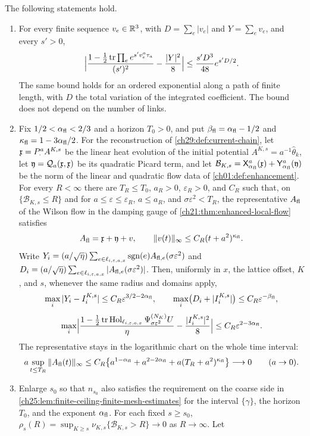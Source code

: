\begin{lemma}\label{ch29:lem:actual-flow-trace-reduction}
The following statements hold.
\begin{enumerate}
\item For every finite sequence $v_e\in\mathbb R^3$, with $D=\sum_e|v_e|$ and $Y=\sum_ev_e$, and every $s'>0$,
\[
 \Bigl|\frac{1-\tfrac12\operatorname{tr}\prod_ee^{s'v_e^a\tau_a}}{(s')^2}-\frac{|Y|^2}8\Bigr|\le\frac{s'D^3}{48}e^{s'D/2}.
\]
The same bound holds for an ordered exponential along a path of finite length, with $D$ the total variation of the integrated coefficient. The bound does not depend on the number of links.
\item Fix $1/2<\alpha_{\mathrm{fl}}<2/3$ and a horizon $T_0>0$, and put $\beta_{\mathrm{fl}}=\alpha_{\mathrm{fl}}-1/2$ and $\kappa_{\mathrm{fl}}=1-3\alpha_{\mathrm{fl}}/2$. For the reconstruction of \cref{ch29:def:current-chain}, let $\mathfrak x=P_{\cdot}^{a}A^{K,s}$ be the linear heat evolution of the initial potential $A^{K,s}=a^{-1}\widehat\theta_k$, let $\mathfrak y=\mathcal Q_{a}(\mathfrak x,\mathfrak x)$ be its quadratic Picard term, and let $\mathcal B_{K,s}=\mathsf X_{\alpha_{\mathrm{fl}}}^{a}(\mathfrak x)+\mathsf Y_{\alpha_{\mathrm{fl}}}^{a}(\mathfrak y)$ be the norm of the linear and quadratic flow data of \cref{ch01:def:enhancement}. For every $R<\infty$ there are $T_R\le T_0$, $a_R>0$, $\varepsilon_R>0$, and $C_R$ such that, on $\{\mathcal B_{K,s}\le R\}$ and for $a\le\varepsilon\le\varepsilon_R$, $a\le a_R$, and $\sigma\varepsilon^2<T_R$, the representative $A_{\rm fl}$ of the Wilson flow in the damping gauge of \cref{ch21:thm:enhanced-local-flow} satisfies
\[
 A_{\rm fl}=\mathfrak x+\mathfrak y+v,\qquad \|v(t)\|_\infty\le C_R(t+a^2)^{\kappa_{\mathrm{fl}}}.
\]
Write $Y_i=(a/\sqrt\eta)\sum_{e\in\ell_{i,\varepsilon,a,x}}\operatorname{sgn}(e)A_{{\rm fl},e}(\sigma\varepsilon^2)$ and $D_i=(a/\sqrt\eta)\sum_{e\in\ell_{i,\varepsilon,a,x}}|A_{{\rm fl},e}(\sigma\varepsilon^2)|$. Then, uniformly in $x$, the lattice offset, $K$, and $s$, whenever the same radius and domains apply,
\[
 \max_i|Y_i-I_i^{K,s}|\le C_R\varepsilon^{3/2-2\alpha_{\mathrm{fl}}},\qquad \max_i\bigl(D_i+|I_i^{K,s}|\bigr)\le C_R\varepsilon^{-\beta_{\mathrm{fl}}},
\]
\[
 \max_i\Bigl|\frac{1-\tfrac12\operatorname{tr}\operatorname{Hol}_{\ell_{i,\varepsilon,a,x}}\Psi^{(N_K)}_{\sigma\varepsilon^2}U}{\eta}-\frac{|I_i^{K,s}|^2}8\Bigr|\le C_R\varepsilon^{2-3\alpha_{\mathrm{fl}}}.
\]
The representative stays in the logarithmic chart on the whole time interval:
\[
 a\sup_{t\le T_R}\|A_{\rm fl}(t)\|_\infty\le C_R\bigl\{a^{1-\alpha_{\mathrm{fl}}}+a^{2-2\alpha_{\mathrm{fl}}}+a(T_R+a^2)^{\kappa_{\mathrm{fl}}}\bigr\}\longrightarrow0\qquad(a\to0).
\]
\item Enlarge $s_0$ so that $n_{s_0}$ also satisfies the requirement on the coarse side in \cref{ch25:lem:finite-ceiling-finite-mesh-estimates} for the interval $\{\gamma\}$, the horizon $T_0$, and the exponent $\alpha_{\mathrm{fl}}$. For each fixed $s\ge s_0$, $\rho_s(R)=\sup_{K\ge s}\nu_{K,s}\{\mathcal B_{K,s}>R\}\to0$ as $R\to\infty$. Let

\end{enumerate}
\end{lemma}
